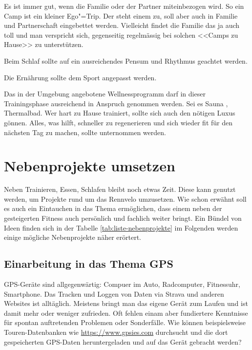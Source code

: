 \documentclass[a4paper,DIV13,BCOR0cm,draft=TRUE]{scrartcl}
\newcommand{\rv}{Rennvelo}
\begin{document}
Es ist immer gut, wenn die Familie oder der Partner miteinbezogen wird.
So ein Camp ist ein kleiner Ego"=Trip. Der steht einem zu, soll aber auch in Familie und Partnerschaft eingebettet werden.
Vielleicht findet die Familie das ja auch toll und man verspricht sich, gegenseitig regelmässig bei solchen <<Camps zu Hause>> zu unterstützen.

Beim Schlaf sollte auf ein ausreichendes Pensum und Rhythmus geachtet werden.

Die Ernährung sollte dem Sport angepasst werden.

Das in der Umgebung angebotene Wellnessprogramm darf in dieser Trainingsphase ausreichend in Anspruch genommen werden.
Sei es Sauna \cite[S. 795]{Weineck2010}, Thermalbad.
Wer hart zu Hause trainiert, sollte sich auch den nötigen Luxus gönnen.
Alles, was hilft, schneller zu regenerieren und sich wieder fit für den nächsten Tag zu machen, sollte unternommen werden.

% 
% 

\section{Nebenprojekte umsetzen}
\label{sec:nebenprojekte}

Neben Trainieren, Essen, Schlafen bleibt noch etwas Zeit.
Diese kann genutzt werden, um Projekte rund um das \rv{} umzusetzen.
Wie schon erwähnt soll es auch ein Eintauchen in das Thema ermöglichen,
dass einem neben der gesteigerten Fitness auch persönlich und fachlich weiter bringt.
Ein Bündel von Ideen finden sich in der Tabelle \ref{tab:liste-nebenprojekte}
im Folgenden werden einige mögliche Nebenprojekte näher erörtert.

\subsection{Einarbeitung in das Thema GPS}
\label{sec:einarbeitung-thema-gps}

GPS-Geräte sind allgegenwärtig: Compuer im Auto, Radcomputer, Fitnessuhr, Smartphone.
Das Tracken und Loggen von Daten via Strava und anderen Websites ist alltäglich.
Meistens bringt man das eigene Gerät zum Laufen und ist damit mehr oder weniger
zufrieden.
Oft fehlen einam aber fundiertere Kenntnisse für spontan auftretenden Problemen oder Sonderfälle.
Wie können beispielsweise Touren-Datenbanken wie \url{https://www.gpsies.com} durchsucht
und die dort gespeicherten GPS-Daten heruntergeladen und auf das Gerät gebracht werden?
\end{document}
